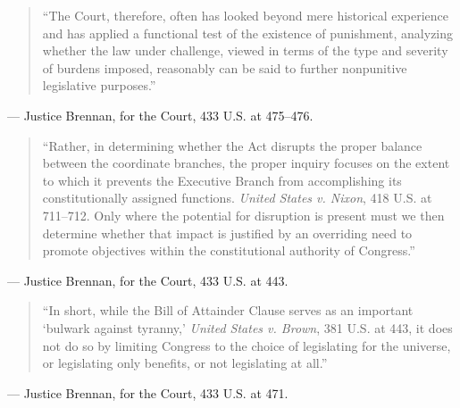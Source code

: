 \documentclass[12pt]{article}
\begin{document}
\begin{quote}
``The Court, therefore, often has looked beyond mere historical experience and has applied a functional test of the existence of punishment, analyzing whether the law under challenge, viewed in terms of the type and severity of burdens imposed, reasonably can be said to further nonpunitive legislative purposes.''
\end{quote}
\noindent --- Justice Brennan, for the Court, 433 U.S. at 475--476.

\begin{quote}
``Rather, in determining whether the Act disrupts the proper balance between the coordinate branches, the proper inquiry focuses on the extent to which it prevents the Executive Branch from accomplishing its constitutionally assigned functions. \textit{United States v. Nixon}, 418 U.S. at 711--712. Only where the potential for disruption is present must we then determine whether that impact is justified by an overriding need to promote objectives within the constitutional authority of Congress.''
\end{quote}
\noindent --- Justice Brennan, for the Court, 433 U.S. at 443.

\begin{quote}
``In short, while the Bill of Attainder Clause serves as an important `bulwark against tyranny,' \textit{United States v. Brown}, 381 U.S. at 443, it does not do so by limiting Congress to the choice of legislating for the universe, or legislating only benefits, or not legislating at all.''
\end{quote}
\noindent --- Justice Brennan, for the Court, 433 U.S. at 471.
\end{document}
